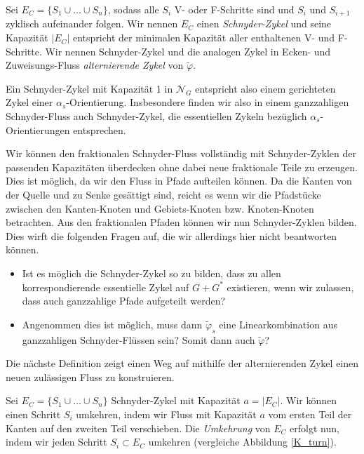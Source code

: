 \begin{definition}
Sei $E_C = \{S_1\cup \ldots \cup S_n\}$, sodass alle $S_i$ V- oder F-Schritte sind und $S_i$ und $S_{i+1}$ zyklisch aufeinander folgen. Wir nennen $E_C$ einen \textit{Schnyder-Zykel} und seine Kapazität $|E_C|$ entspricht der minimalen Kapazität aller enthaltenen V- und F-Schritte. Wir nennen Schnyder-Zykel und die analogen Zykel in Ecken- und Zuweisungs-Fluss \textit{alternierende Zykel} von $\tilde{\varphi}$.
\end{definition}

Ein Schnyder-Zykel mit Kapazität 1 in $\mathcal{N}_G$ entspricht also einem gerichteten Zykel einer $\alpha_s$-Orientierung. Insbesondere finden wir also in einem ganzzahligen Schnyder-Fluss auch Schnyder-Zykel, die essentiellen Zykeln bezüglich $\alpha_s$-Orientierungen entsprechen.

\begin{remark}
Wir können den fraktionalen Schnyder-Fluss vollständig mit Schnyder-Zyklen der passenden Kapazitäten überdecken ohne dabei neue fraktionale Teile zu erzeugen. Dies ist möglich, da wir den Fluss in Pfade aufteilen können. Da die Kanten von der Quelle und zu Senke gesättigt sind, reicht es wenn wir die Pfadstücke zwischen den Kanten-Knoten und Gebiets-Knoten bzw. Knoten-Knoten betrachten. Aus den fraktionalen Pfaden können wir nun Schnyder-Zyklen bilden. Dies wirft die folgenden Fragen auf, die wir allerdings hier nicht beantworten können.
\begin{itemize}
\item Ist es möglich die Schnyder-Zykel so zu bilden, dass zu allen korrespondierende essentielle Zykel auf $G+G^*$ existieren, wenn wir zulassen, dass auch ganzzahlige Pfade aufgeteilt werden?
\item Angenommen dies ist möglich, muss dann $\tilde{\varphi}_s$ eine Linearkombination aus ganzzahligen Schnyder-Flüssen sein? Somit dann auch $\tilde{\varphi}$?
\end{itemize}
\end{remark}

Die nächste Definition zeigt einen Weg auf mithilfe der alternierenden Zykel einen neuen zulässigen Fluss zu konstruieren.

\begin{definition}
Sei $E_C = \{S_1\cup \ldots \cup S_n\}$ Schnyder-Zykel mit Kapazität $a=|E_C|$. Wir können einen Schritt $S_i$ umkehren, indem wir Fluss mit Kapazität $a$ vom ersten Teil der Kanten auf den zweiten Teil verschieben. Die \textit{Umkehrung} von $E_C$ erfolgt nun, indem wir jeden Schritt $S_i \subset E_C$ umkehren (vergleiche Abbildung \ref{K_turn}).
\end{definition}

